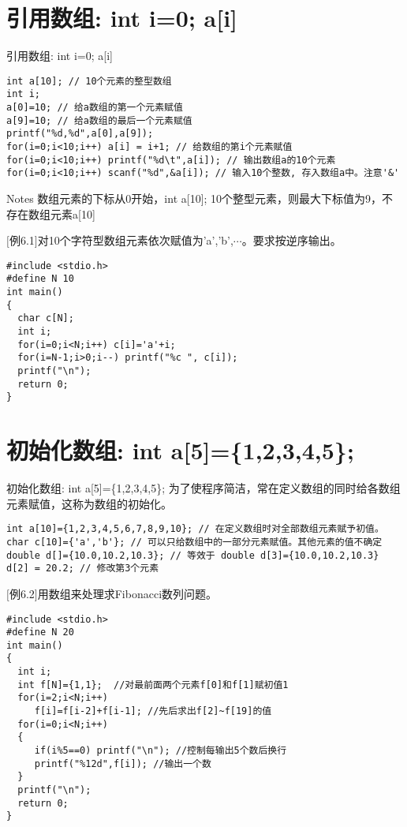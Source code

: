 \section{引用数组: int i=0; a[i]}

\begin{frame}{引用数组: int i=0; a[i]}
\begin{lstlisting}
int a[10]; // 10个元素的整型数组
int i;
a[0]=10; // 给a数组的第一个元素赋值
a[9]=10; // 给a数组的最后一个元素赋值
printf("%d,%d",a[0],a[9]);
for(i=0;i<10;i++) a[i] = i+1; // 给数组的第i个元素赋值
for(i=0;i<10;i++) printf("%d\t",a[i]); // 输出数组a的10个元素
for(i=0;i<10;i++) scanf("%d",&a[i]); // 输入10个整数, 存入数组a中。注意'&'
\end{lstlisting}
\begin{block}{Notes}
	数组元素的下标从0开始，int a[10]; 10个整型元素，则最大下标值为9，不存在数组元素a[10]
\end{block}
\end{frame}

\begin{frame}
$[$例6.1$]$对10个字符型数组元素依次赋值为'a','b',$\cdots$。要求按逆序输出。
\pause
\begin{lstlisting}
#include <stdio.h>
#define N 10
int main()
{
  char c[N];
  int i;
  for(i=0;i<N;i++) c[i]='a'+i; 
  for(i=N-1;i>0;i--) printf("%c ", c[i]);
  printf("\n");
  return 0;
}
\end{lstlisting}
\end{frame}

\section{初始化数组: int a[5]=\{1,2,3,4,5\};}

\begin{frame}{初始化数组: int a[5]=\{1,2,3,4,5\};}
为了使程序简洁，常在定义数组的同时给各数组元素赋值，这称为数组的初始化。
\begin{lstlisting}
int a[10]={1,2,3,4,5,6,7,8,9,10}; // 在定义数组时对全部数组元素赋予初值。
char c[10]={'a','b'}; // 可以只给数组中的一部分元素赋值。其他元素的值不确定
double d[]={10.0,10.2,10.3}; // 等效于 double d[3]={10.0,10.2,10.3}
d[2] = 20.2; // 修改第3个元素
\end{lstlisting}
\end{frame}

\begin{frame}
$[$例6.2$]$用数组来处理求Fibonacci数列问题。
\begin{lstlisting}
#include <stdio.h>
#define N 20
int main()
{
  int i;
  int f[N]={1,1};  //对最前面两个元素f[0]和f[1]赋初值1
  for(i=2;i<N;i++)
     f[i]=f[i-2]+f[i-1]; //先后求出f[2]~f[19]的值
  for(i=0;i<N;i++)
  {
     if(i%5==0) printf("\n"); //控制每输出5个数后换行
     printf("%12d",f[i]); //输出一个数
  }
  printf("\n");
  return 0;
}
\end{lstlisting}
\end{frame}

